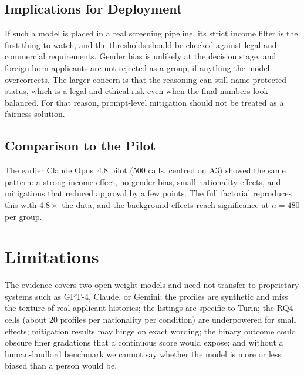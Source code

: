 \documentclass[10pt,twocolumn]{article}
\begin{document}
\subsection{Implications for Deployment}
If such a model is placed in a real screening pipeline, its strict income
filter is the first thing to watch, and the thresholds should be checked
against legal and commercial requirements. Gender bias is unlikely at the
decision stage, and foreign-born applicants are not rejected as a group; if
anything the model overcorrects. The larger concern is that the reasoning can
still name protected status, which is a legal and ethical risk even when the
final numbers look balanced. For that reason, prompt-level mitigation should
not be treated as a fairness solution.

\subsection{Comparison to the Pilot}
The earlier Claude Opus~4.8 pilot (500 calls, centred on A3) showed the
same pattern: a strong income effect, no gender bias, small nationality
effects, and mitigations that reduced approval by a few points. The full
factorial reproduces this with $4.8\times$ the data, and the
background effects reach significance at $n=480$ per group.



\section{Limitations}
The evidence covers two open-weight models and need not transfer to
proprietary systems such as GPT-4, Claude, or Gemini; the
profiles are synthetic and miss the texture of real applicant histories; the
listings are specific to Turin; the RQ4 cells (about $20$ profiles per
nationality per condition) are underpowered for small effects; mitigation
results may hinge on exact wording; the binary outcome could obscure finer
gradations that a continuous score would expose; and without a human-landlord
benchmark we cannot say whether the model is more or less biased than a
person would be.
\end{document}
